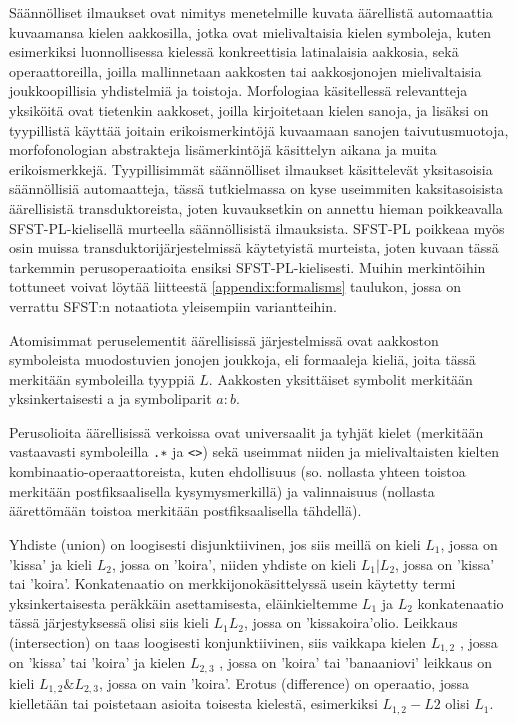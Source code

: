 \documentclass[free]{flammie}
\begin{document}
Säännölliset ilmaukset ovat nimitys menetelmille kuvata äärellistä automaattia
kuvaamansa kielen aakkosilla, jotka ovat mielivaltaisia kielen symboleja, kuten
esimerkiksi luonnollisessa kielessä konkreettisia latinalaisia aakkosia, sekä operaattoreilla, joilla mallinnetaan aakkosten tai aakkosjonojen mielivaltaisia joukkoopillisia yhdistelmiä ja toistoja. Morfologiaa käsitellessä relevantteja yksiköitä
ovat tietenkin aakkoset, joilla kirjoitetaan kielen sanoja, ja lisäksi on tyypillistä
käyttää joitain erikoismerkintöjä kuvaamaan sanojen taivutusmuotoja, morfofonologian abstrakteja lisämerkintöjä käsittelyn aikana ja muita erikoismerkkejä. Tyypillisimmät säännölliset ilmaukset käsittelevät yksitasoisia säännöllisiä automaatteja, tässä tutkielmassa on kyse useimmiten kaksitasoisista äärellisistä transduktoreista, joten kuvauksetkin on annettu hieman poikkeavalla SFST-PL-kielisellä
murteella säännöllisistä ilmauksista. SFST-PL poikkeaa myös osin muissa
transduktorijärjestelmissä käytetyistä murteista, joten kuvaan tässä tarkemmin
perusoperaatioita ensiksi SFST-PL-kielisesti. Muihin merkintöihin tottuneet
voivat löytää liitteestä \ref{appendix:formalisms} taulukon, jossa on verrattu SFST:n notaatiota yleisempiin variantteihin.

Atomisimmat peruselementit äärellisissä järjestelmissä ovat aakkoston symboleista muodostuvien jonojen joukkoja, eli formaaleja kieliä, joita tässä merkitään symboleilla tyyppiä $L$. Aakkosten yksittäiset symbolit merkitään yksinkertaisesti a
ja symboliparit $a : b$.

Perusolioita äärellisissä verkoissa ovat universaalit ja tyhjät kielet
(merkitään vastaavasti symboleilla \texttt{.∗} ja \texttt{<>}) sekä useimmat niiden ja mielivaltaisten kielten
kombinaatio-operaattoreista, kuten ehdollisuus (so. nollasta yhteen toistoa merkitään postfiksaalisella kysymysmerkillä) ja valinnaisuus (nollasta äärettömään toistoa merkitään postfiksaalisella tähdellä).

Yhdiste (union) on loogisesti disjunktiivinen, jos siis meillä on kieli $L_1$,
jossa on ’kissa’ ja kieli $L_2$, jossa on ’koira’, niiden yhdiste on kieli $L_1
| L_2$,
jossa on ’kissa’ tai ’koira’. Konkatenaatio on merkkijonokäsittelyssä usein
käytetty termi yksinkertaisesta peräkkäin asettamisesta, eläinkieltemme $L_1$ ja
$L_2$
konkatenaatio tässä järjestyksessä olisi siis kieli $L_1 L_2$, jossa on
’kissakoira’olio. Leikkaus (intersection) on taas loogisesti konjunktiivinen,
siis vaikkapa kielen $L_{1,2}$ , jossa on ’kissa’ tai ’koira’ ja kielen $L_{2,3}$ , jossa
on ’koira’ tai ’banaaniovi’ leikkaus on kieli $L_{1,2} \& L_{2,3}$, jossa on vain ’koira’. Erotus (difference)
on operaatio, jossa kielletään tai poistetaan asioita toisesta kielestä, esimerkiksi
$L_{1,2} − L2$ olisi $L_1$.
\end{document}

